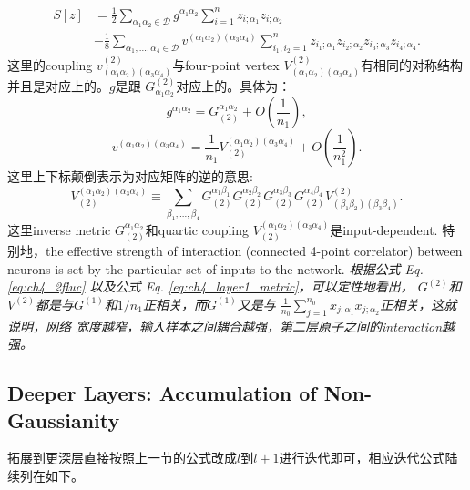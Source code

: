 \begin{equation}
    \begin{aligned}
    S[z] &= \frac{1}{2} \sum_{\alpha_1\alpha_2\in\mathcal{D}}g^{\alpha_1\alpha_2}
    \sum_{i=1}^n z_{i;\alpha_1}z_{i;\alpha_2} \\
    &- \frac{1}{8}\sum_{\alpha_1,...,\alpha_4\in\mathcal{D}}v^{(\alpha_1\alpha_2)(\alpha_3\alpha_4)}
    \sum_{i_1,i_2=1}^n z_{i_1;\alpha_1}z_{i_2;\alpha_2}z_{i_3;\alpha_3}z_{i_4;\alpha_4}.
    \end{aligned}
\end{equation}
这里的coupling $v^{(2)}_{(\alpha_1\alpha_2)(\alpha_3\alpha_4)}$与four-point vertex 
$V^{(2)}_{(\alpha_1\alpha_2)(\alpha_3\alpha_4)}$有相同的对称结构并且是对应上的。$g$是跟
$G_{\alpha_1\alpha_2}^{(2)}$对应上的。具体为：
\begin{equation}
    g^{\alpha_1\alpha_2} = G_{(2)}^{\alpha_1\alpha_2} + O(\frac{1}{n_1}),
\end{equation}
\begin{equation}
    v^{(\alpha_1\alpha_2)(\alpha_3\alpha_4)} =
    \frac{1}{n_1}V_{(2)}^{(\alpha_1\alpha_2)(\alpha_3\alpha_4)} + O(\frac{1}{n_1^2}).
\end{equation}
这里上下标颠倒表示为对应矩阵的逆的意思:
\begin{equation}
    V_{(2)}^{(\alpha_1\alpha_2)(\alpha_3\alpha_4)} \equiv \sum_{\beta_1,...,\beta_4}
    G_{(2)}^{\alpha_1\beta_1}G_{(2)}^{\alpha_2\beta_2}G_{(2)}^{\alpha_3\beta_3}
    G_{(2)}^{\alpha_4\beta_4}V_{(\beta_1\beta_2)(\beta_3\beta_4)}^{(2)}.
\end{equation}
这里inverse metric $G_{(2)}^{\alpha_1\alpha_2}$和quartic coupling 
$V_{(2)}^{(\alpha_1\alpha_2)(\alpha_3\alpha_4)}$是input-dependent. 特别地，the effective
strength of interaction (connected 4-point correlator)
between neurons is set by the particular set of inputs to the network. 
\emph{根据公式 Eq. \ref{eq:ch4_2fluc} 以及公式 Eq. \ref{eq:ch4_layer1_metric}，可以定性地看出，
$G^{(2)}$和$V^{(2)}$都是与$G^{(1)}$和$1/n_1$正相关，而$G^{(1)}$又是与
$\frac{1}{n_0}\sum_{j=1}^{n_0}x_{j;\alpha_1}x_{j;\alpha_2}$正相关，这就说明，网络
宽度越窄，输入样本之间耦合越强，第二层原子之间的interaction越强。}

\subsection{Deeper Layers: Accumulation of Non-Gaussianity}
拓展到更深层直接按照上一节的公式改成$l$到$l+1$进行迭代即可，相应迭代公式陆续列在如下。

